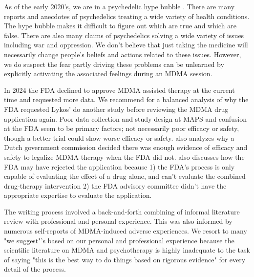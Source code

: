 \documentclass[12pt,letterpaper]{book}
\begin{document}
As of the early 2020's, we are in a psychedelic hype bubble \cite{yaden2022preparing}. There are many reports and anecdotes of psychedelics treating a wide variety of health conditions. The hype bubble makes it difficult to figure out which are true and which are false. There are also many claims of psychedelics solving a wide variety of issues including war and oppression. We don't believe that just taking the medicine will necessarily change people's beliefs and actions related to these issues. However, we do suspect the fear partly driving these problems can be unlearned by explicitly activating the associated feelings during an MDMA session.

In 2024 the FDA declined to approve MDMA assisted therapy at the current time and requested more data. We recommend \textcite{evansBlame} for a balanced analysis of why the FDA requested Lykos' do another study before reviewing the MDMA drug application again. Poor data collection and study design at MAPS and confusion at the FDA seem to be primary factors; not necessarily poor efficacy or safety, though a better trial could show worse efficacy or safety. \textcite{fdaVSdutch} also analyzes why a Dutch government commission decided there was enough evidence of efficacy and safety to legalize MDMA-therapy when the FDA did not. \textcite{schenberg2024psychedelic} also discusses how the FDA may have rejected the application because 1) the FDA's process is only capable of evaluating the effect of a drug alone, and can't evaluate the combined drug-therapy intervention 2) the FDA advisory committee didn't have the appropriate expertise to evaluate the application.


The writing process involved a back-and-forth combining of informal literature review with professional and personal experience. This was also informed by numerous self-reports of MDMA-induced adverse experiences. We resort to many "we suggest"'s based on our personal and professional experience because the scientific literature on MDMA and psychotherapy is highly inadequate to the task of saying "this is the best way to do things based on rigorous evidence" for every detail of the process.  
\end{document}
